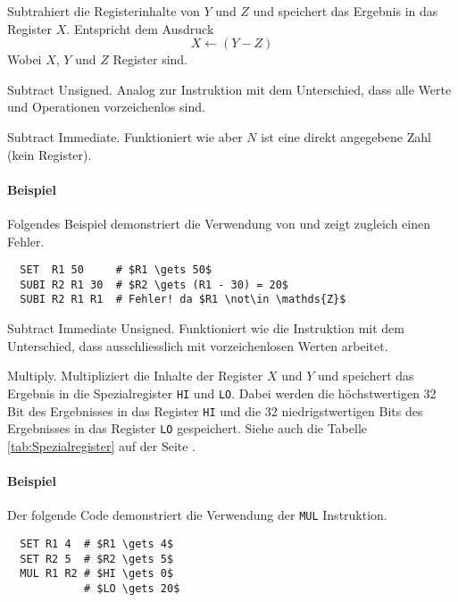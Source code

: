 Subtrahiert die Registerinhalte von $Y$ und $Z$ und speichert das Ergebnis in
das Register $X$. Entspricht dem Ausdruck
\[
    X \gets (Y - Z)
\]
Wobei $X$, $Y$ und $Z$ Register sind.



\glqq Subtract Unsigned\grqq.
Analog zur Instruktion  mit dem Unterschied, dass alle Werte und
Operationen vorzeichenlos sind.


\glqq Subtract Immediate\grqq.
Funktioniert wie  aber $N$ ist eine direkt angegebene Zahl
(kein Register).

\paragraph{Beispiel}
Folgendes Beispiel demonstriert die Verwendung von  und zeigt
zugleich einen Fehler.
\begin{lstlisting}
  SET  R1 50     # $R1 \gets 50$
  SUBI R2 R1 30  # $R2 \gets (R1 - 30) = 20$
  SUBI R2 R1 R1  # Fehler! da $R1 \not\in \mathds{Z}$
\end{lstlisting}


\glqq Subtract Immediate Unsigned\grqq.
Funktioniert wie die Instruktion  mit dem Unterschied, dass
 ausschliesslich mit vorzeichenlosen Werten arbeitet. 



\glqq Multiply\grqq. 
Multipliziert die Inhalte der Register $X$ und $Y$ und speichert das Ergebnis in
die Spezialregister \texttt{HI} und \texttt{LO}. Dabei werden die höchstwertigen
32 Bit des Ergebnisses in das Register \texttt{HI} und die 32 niedrigstwertigen
Bits des Ergebnisses in das Register \texttt{LO} gespeichert.
Siehe auch die Tabelle \ref{tab:Spezialregister} auf der Seite
\pageref{tab:Spezialregister}.

\paragraph{Beispiel} Der folgende Code demonstriert die Verwendung der
\texttt{MUL} Instruktion.
\begin{lstlisting}
  SET R1 4  # $R1 \gets 4$
  SET R2 5  # $R2 \gets 5$
  MUL R1 R2 # $HI \gets 0$
            # $LO \gets 20$
\end{lstlisting}




